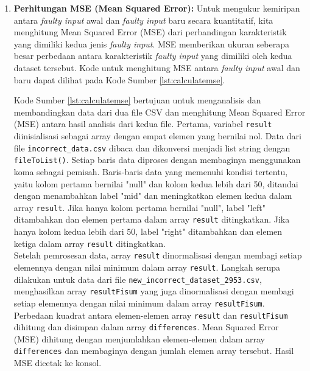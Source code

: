 \begin{enumerate}[topsep=0pt]
    \item \textbf{Perhitungan MSE (Mean Squared Error):}
      Untuk mengukur kemiripan antara \emph{faulty input} awal dan \emph{faulty input} baru secara kuantitatif, kita menghitung Mean Squared Error (MSE) dari perbandingan karakteristik yang dimiliki kedua jenis \emph{faulty input}. MSE memberikan ukuran seberapa besar perbedaan antara karakteristik \emph{faulty input} yang dimiliki oleh kedua dataset tersebut.
      Kode untuk menghitung MSE antara \emph{faulty input} awal dan baru dapat dilihat pada Kode Sumber \ref{lst:calculatemse}.

      

      Kode Sumber \ref{lst:calculatemse} bertujuan untuk menganalisis dan membandingkan data dari dua file CSV dan menghitung Mean Squared Error (MSE) antara hasil analisis dari kedua file. Pertama, variabel \texttt{result} diinisialisasi sebagai array dengan empat elemen yang bernilai nol. Data dari file \texttt{incorrect\_data.csv} dibaca dan dikonversi menjadi list string dengan \texttt{fileToList()}. Setiap baris data diproses dengan membaginya menggunakan koma sebagai pemisah.
      Baris-baris data yang memenuhi kondisi tertentu, yaitu kolom pertama bernilai "null" dan kolom kedua lebih dari 50, ditandai dengan menambahkan label "mid" dan meningkatkan elemen kedua dalam array \texttt{result}. Jika hanya kolom pertama bernilai "null", label "left" ditambahkan dan elemen pertama dalam array \texttt{result} ditingkatkan. Jika hanya kolom kedua lebih dari 50, label "right" ditambahkan dan elemen ketiga dalam array \texttt{result} ditingkatkan. 
      \\

      Setelah pemrosesan data, array \texttt{result} dinormalisasi dengan membagi setiap elemennya dengan nilai minimum dalam array \texttt{result}. Langkah serupa dilakukan untuk data dari file \texttt{new\_incorrect\_dataset\_2953.csv}, menghasilkan array \texttt{resultFisum} yang juga dinormalisasi dengan membagi setiap elemennya dengan nilai minimum dalam array \texttt{resultFisum}.
      Perbedaan kuadrat antara elemen-elemen array \texttt{result} dan \texttt{resultFisum} dihitung dan disimpan dalam array \texttt{differences}. Mean Squared Error (MSE) dihitung dengan menjumlahkan elemen-elemen dalam array \texttt{differences} dan membaginya dengan jumlah elemen array tersebut. Hasil MSE dicetak ke konsol.
      \\

\end{enumerate}


